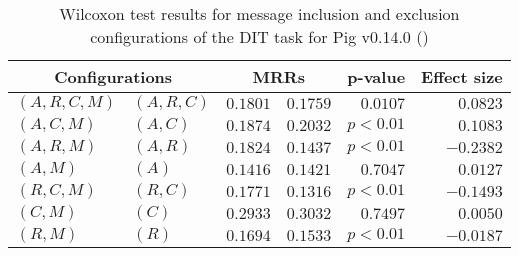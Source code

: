 
\begin{table}
\begin{spacing}{1.2}
\centering
\caption{Wilcoxon test results for message inclusion and exclusion configurations of the DIT task for Pig v0.14.0 (\ctwo)}
\label{table:versus-wilcox-pig-dit-message}
\begin{tabular}{ll|rr|rr}
\toprule
      \multicolumn{2}{c|}{Configurations} &                \multicolumn{2}{c|}{MRRs} &             p-value & Effect size \\
\midrule
 $(A,R,C,M)$ &  $(A,R,C)$ &  $\bm{0.1801}$ &       $0.1759$ & $0.0107$ &    $0.0823$ \\
   $(A,C,M)$ &    $(A,C)$ &       $0.1874$ &  $\bm{0.2032}$ & $p<0.01$ &    $0.1083$ \\
   $(A,R,M)$ &    $(A,R)$ &  $\bm{0.1824}$ &       $0.1437$ & $p<0.01$ &   $-0.2382$ \\
     $(A,M)$ &      $(A)$ &       $0.1416$ &  $\bm{0.1421}$ & $0.7047$ &    $0.0127$ \\
   $(R,C,M)$ &    $(R,C)$ &  $\bm{0.1771}$ &       $0.1316$ & $p<0.01$ &   $-0.1493$ \\
     $(C,M)$ &      $(C)$ &       $0.2933$ &  $\bm{0.3032}$ & $0.7497$ &    $0.0050$ \\
     $(R,M)$ &      $(R)$ &  $\bm{0.1694}$ &       $0.1533$ & $p<0.01$ &   $-0.0187$ \\
\bottomrule
\end{tabular}

\end{spacing}
\end{table}

